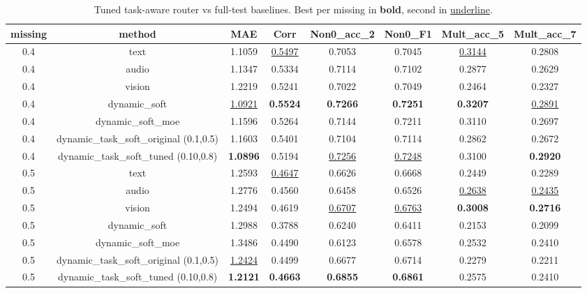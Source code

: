 \begin{table}[t]
\centering
\small
\caption{Tuned task-aware router vs full-test baselines. Best per missing in \textbf{bold}, second in \underline{underline}.}
\begin{tabular}{cc|cccccc}
\toprule
missing & method & MAE & Corr & Non0\_acc\_2 & Non0\_F1 & Mult\_acc\_5 & Mult\_acc\_7 \\
\midrule
0.4 & text & 1.1059 & \underline{0.5497} & 0.7053 & 0.7045 & \underline{0.3144} & 0.2808 \\
0.4 & audio & 1.1347 & 0.5334 & 0.7114 & 0.7102 & 0.2877 & 0.2629 \\
0.4 & vision & 1.2219 & 0.5241 & 0.7022 & 0.7049 & 0.2464 & 0.2327 \\
0.4 & dynamic\_soft & \underline{1.0921} & \textbf{0.5524} & \textbf{0.7266} & \textbf{0.7251} & \textbf{0.3207} & \underline{0.2891} \\
0.4 & dynamic\_soft\_moe & 1.1596 & 0.5264 & 0.7144 & 0.7211 & 0.3110 & 0.2697 \\
0.4 & dynamic\_task\_soft\_original (0.1,0.5) & 1.1603 & 0.5401 & 0.7104 & 0.7114 & 0.2862 & 0.2672 \\
0.4 & dynamic\_task\_soft\_tuned (0.10,0.8) & \textbf{1.0896} & 0.5194 & \underline{0.7256} & \underline{0.7248} & 0.3100 & \textbf{0.2920} \\
0.5 & text & 1.2593 & \underline{0.4647} & 0.6626 & 0.6668 & 0.2449 & 0.2289 \\
0.5 & audio & 1.2776 & 0.4560 & 0.6458 & 0.6526 & \underline{0.2638} & \underline{0.2435} \\
0.5 & vision & 1.2494 & 0.4619 & \underline{0.6707} & \underline{0.6763} & \textbf{0.3008} & \textbf{0.2716} \\
0.5 & dynamic\_soft & 1.2988 & 0.3788 & 0.6240 & 0.6411 & 0.2153 & 0.2099 \\
0.5 & dynamic\_soft\_moe & 1.3486 & 0.4490 & 0.6123 & 0.6578 & 0.2532 & 0.2410 \\
0.5 & dynamic\_task\_soft\_original (0.1,0.5) & \underline{1.2424} & 0.4499 & 0.6677 & 0.6714 & 0.2279 & 0.2211 \\
0.5 & dynamic\_task\_soft\_tuned (0.10,0.8) & \textbf{1.2121} & \textbf{0.4663} & \textbf{0.6855} & \textbf{0.6861} & 0.2575 & 0.2410 \\
\bottomrule
\end{tabular}
\end{table}